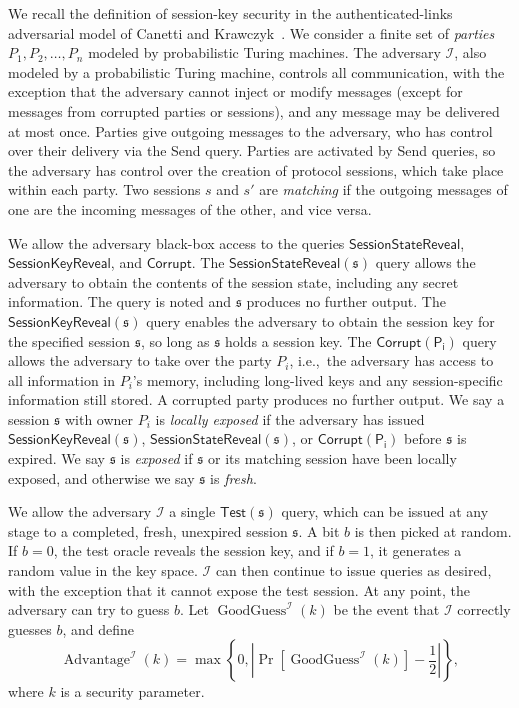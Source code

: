 We recall the definition of session-key security in the
authenticated-links adversarial model of Canetti and
Krawczyk~\cite{canetti}. We consider a finite set of \emph{parties}
$P_1, P_2, \ldots, P_n$ modeled by probabilistic Turing machines.  The
adversary $\mathcal{I}$, also modeled by a probabilistic Turing
machine, controls all communication, with the exception that the
adversary cannot inject or modify messages (except for messages from
corrupted parties or sessions), and any message may be delivered at
most once. Parties give outgoing messages to the adversary, who has
control over their delivery via the \textsf{Send} query. Parties are
activated by \textsf{Send} queries, so the adversary has control over
the creation of protocol sessions, which take place within each party.
Two sessions $s$ and $s'$ are \emph{matching} if the outgoing messages
of one are the incoming messages of the other, and vice versa.

We allow the adversary black-box access to the queries
$\mathsf{SessionStateReveal}$, $\mathsf{SessionKeyReveal}$, and
$\mathsf{Corrupt}$. The $\mathsf{SessionStateReveal}(\mathfrak{s})$
query allows the adversary to obtain the contents of the session
state, including any secret information. The query is noted and
$\mathfrak{s}$ produces no further output.  The
$\mathsf{SessionKeyReveal(\mathfrak{s})}$ query enables the adversary
to obtain the session key for the specified session $\mathfrak{s}$, so
long as $\mathfrak{s}$ holds a session key. The
$\mathsf{Corrupt(P_i)}$ query allows the adversary to take over the
party $P_i$, i.e.,\ the adversary has access to all information in
$P_i$'s memory, including long-lived keys and any session-specific
information still stored. A corrupted party produces no further
output. We say a session $\mathfrak{s}$ with owner $P_i$ is
\emph{locally exposed} if the adversary has issued
$\mathsf{SessionKeyReveal(\mathfrak{s})}$,
$\mathsf{SessionStateReveal(\mathfrak{s})}$, or
$\mathsf{Corrupt(P_i)}$ before $\mathfrak{s}$ is expired. We say
$\mathfrak{s}$ is \emph{exposed} if $\mathfrak{s}$ or its matching
session have been locally exposed, and otherwise we say $\mathfrak{s}$
is \emph{fresh}.

We allow the adversary $\mathcal{I}$ a single
$\mathsf{Test(\mathfrak{s})}$ query, which can be issued at any stage
to a completed, fresh, unexpired session $\mathfrak{s}$. A bit $b$ is
then picked at random. If $b=0$, the test oracle reveals the session
key, and if $b=1$, it generates a random value in the key
space. $\mathcal{I}$ can then continue to issue queries as desired,
with the exception that it cannot expose the test session. At any
point, the adversary can try to guess $b$. Let
$\operatorname{GoodGuess}^{\mathcal{I}}(k)$ be the event that
$\mathcal{I}$ correctly guesses $b$, and define \[
\operatorname{Advantage}^{\mathcal{I}}(k) = \max \left\{0, \left \vert
\operatorname{Pr}[\operatorname{GoodGuess}^{\mathcal{I}}(k)] - \frac 1
2 \right \vert \right\},\] where $k$ is a security parameter.

